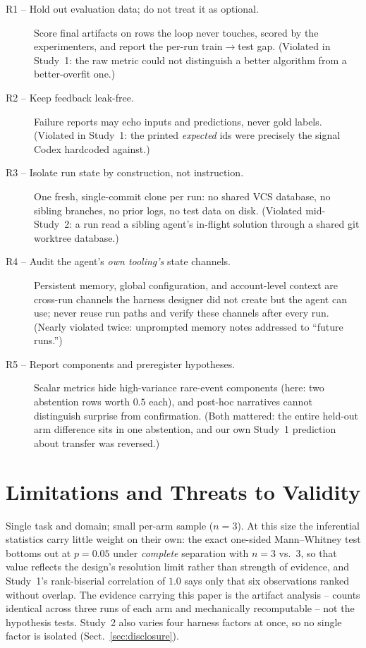 \documentclass[runningheads]{llncs}
\begin{document}
\begin{description}
\item[R1 -- Hold out evaluation data; do not treat it as optional.] Score final
  artifacts on rows the loop never touches, scored by the experimenters,
  and report the per-run train$\to$test gap. (Violated in Study~1: the raw
  metric could not distinguish a better algorithm from a better-overfit
  one.)
\item[R2 -- Keep feedback leak-free.] Failure reports may echo inputs
  and predictions, never gold labels. (Violated in Study~1: the printed
  \emph{expected} ids were precisely the signal Codex hardcoded against.)
\item[R3 -- Isolate run state by construction, not instruction.] One fresh,
  single-commit clone per run: no shared VCS database, no sibling branches,
  no prior logs, no test data on disk. (Violated mid-Study~2: a run read a
  sibling agent's in-flight solution through a shared git worktree
  database.)
\item[R4 -- Audit the agent's \emph{own tooling's} state channels.]
  Persistent memory, global configuration, and account-level context are
  cross-run channels the harness designer did not create but the agent can
  use; never reuse run paths and verify these channels after every run.
  (Nearly violated twice: unprompted memory notes addressed to ``future
  runs.'')
\item[R5 -- Report components and preregister hypotheses.] Scalar metrics
  hide high-variance rare-event components (here: two abstention rows worth
  $0.5$ each), and post-hoc narratives cannot distinguish surprise from
  confirmation. (Both mattered: the entire held-out arm difference sits in
  one abstention, and our own Study~1 prediction about transfer was
  reversed.)
\end{description}

\section{Limitations and Threats to Validity}
\label{sec:limitations}

Single task and domain; small per-arm sample ($n=3$). At this size the
inferential statistics carry little weight on their own: the exact
one-sided Mann--Whitney test bottoms out at $p=0.05$ under \emph{complete}
separation with $n=3$ vs.\ $3$, so that value reflects the design's
resolution limit rather than strength of evidence, and Study~1's
rank-biserial correlation of $1.0$ says only that six observations ranked
without overlap. The evidence carrying this paper is the artifact analysis
-- counts identical across three runs of each arm and mechanically
recomputable -- not the hypothesis tests. Study~2 also varies four harness
factors at once, so no single factor is isolated
(Sect.~\ref{sec:disclosure}).
\end{document}
